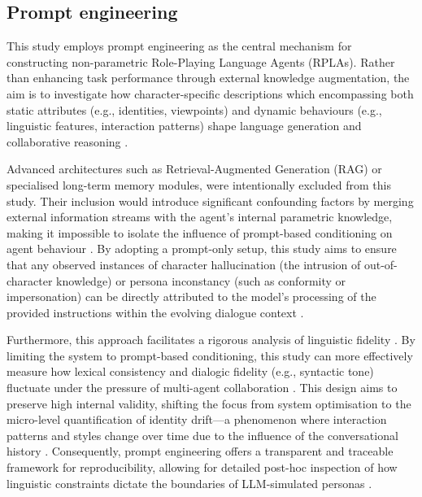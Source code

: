 \documentclass{article}
\begin{document}
\subsection{Prompt engineering}

This study employs prompt engineering as the central mechanism for constructing non-parametric Role-Playing Language Agents (RPLAs). Rather than enhancing task performance through external knowledge augmentation, the aim is to investigate how character-specific descriptions which encompassing both static attributes (e.g., identities, viewpoints) and dynamic behaviours (e.g., linguistic features, interaction patterns) shape language generation and collaborative reasoning \citep{zhou2023characterglm, chen2024review}. 

Advanced architectures such as Retrieval-Augmented Generation (RAG) or specialised long-term memory modules, were intentionally excluded from this study. Their inclusion would introduce significant confounding factors by merging external information streams with the agent's internal parametric knowledge, making it impossible to isolate the influence of prompt-based conditioning on agent behaviour \citep{liu2023dynamic, guo2024review, xi2025review}. By adopting a prompt-only setup, this study aims to ensure that any observed instances of character hallucination (the intrusion of out-of-character knowledge) \citep{shao2023characterllm} or persona inconstancy (such as conformity or impersonation) \citep{baltaji2024cultured} can be directly attributed to the model's processing of the provided instructions within the evolving dialogue context \citep{chen2024review}.

Furthermore, this approach facilitates a rigorous analysis of linguistic fidelity \citep{wang2024rolellm}. By limiting the system to prompt-based conditioning, this study can more effectively measure how lexical consistency and dialogic fidelity (e.g., syntactic tone) fluctuate under the pressure of multi-agent collaboration \citep{wang2024rolellm, ji2025enhancing}. This design aims to preserve high internal validity, shifting the focus from system optimisation to the micro-level quantification of identity drift—a phenomenon where interaction patterns and styles change over time due to the influence of the conversational history \cite{choi2024examining}. Consequently, prompt engineering offers a transparent and traceable framework for reproducibility, allowing for detailed post-hoc inspection of how linguistic constraints dictate the boundaries of LLM-simulated personas \citep{delima2025detective}.
\end{document}
